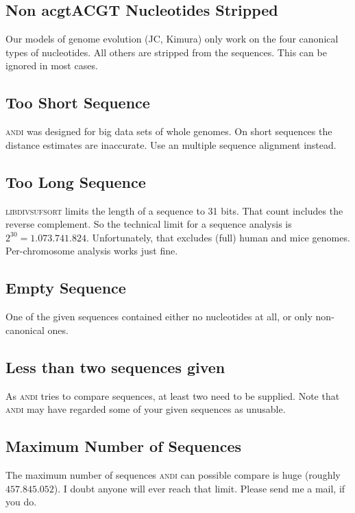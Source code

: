 \documentclass[a4paper,
  10pt,
  english,
  DIV=12,
  BCOR=8mm]{scrbook}
\newcommand{\algo}[1]{\textsc{{#1}}}
\newcommand{\andi}{\algo{andi}\xspace}
\begin{document}
\subsection*{Non acgtACGT Nucleotides Stripped}

Our models of genome evolution (JC, Kimura) only work on the four canonical types of nucleotides. All others are stripped from the sequences. This can be ignored in most cases.

\subsection*{Too Short Sequence}

\andi was designed for big data sets of whole genomes. On short sequences the distance estimates are inaccurate. Use an multiple sequence alignment instead.

\subsection*{Too Long Sequence}

\algo{libdivsufsort} limits the length of a sequence to 31 bits. That count includes the reverse complement. So the technical limit for a sequence analysis is $2^{30} = 1.073.741.824$. Unfortunately, that excludes (full) human and mice genomes. Per-chromosome analysis works just fine.

\subsection*{Empty Sequence}

One of the given sequences contained either no nucleotides at all, or only non-canonical ones.

\subsection*{Less than two sequences given}

As \andi tries to compare sequences, at least two need to be supplied. Note that \andi may have regarded some of your given sequences as unusable.

\subsection*{Maximum Number of Sequences}

The maximum number of sequences \andi can possible compare is huge (roughly $457.845.052$). I doubt anyone will ever reach that limit. Please send me a mail, if you do.
\end{document}
